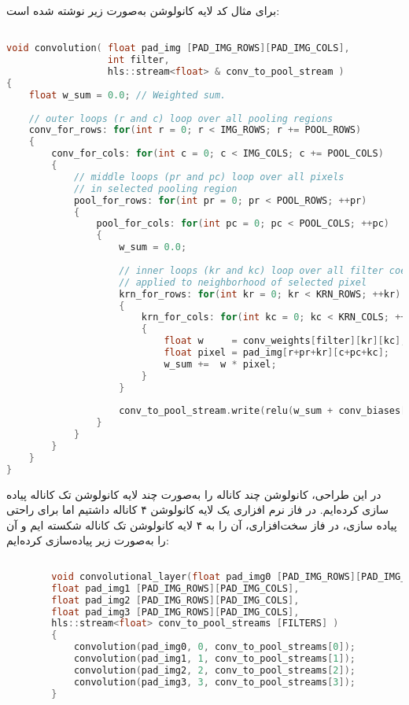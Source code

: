 برای مثال کد لایه کانولوشن به‌صورت زیر نوشته شده است:




\begin{latin}
\begin{lstlisting}[language=C,caption={HLS Implementation of Convolution Layer}]

void convolution( float pad_img [PAD_IMG_ROWS][PAD_IMG_COLS],
				  int filter,
				  hls::stream<float> & conv_to_pool_stream )
{
	float w_sum = 0.0; // Weighted sum.
	
	// outer loops (r and c) loop over all pooling regions
	conv_for_rows: for(int r = 0; r < IMG_ROWS; r += POOL_ROWS)
	{
		conv_for_cols: for(int c = 0; c < IMG_COLS; c += POOL_COLS)
		{
			// middle loops (pr and pc) loop over all pixels
			// in selected pooling region
			pool_for_rows: for(int pr = 0; pr < POOL_ROWS; ++pr)
			{
				pool_for_cols: for(int pc = 0; pc < POOL_COLS; ++pc)
				{
					w_sum = 0.0;
					
					// inner loops (kr and kc) loop over all filter coefficients
					// applied to neighborhood of selected pixel
					krn_for_rows: for(int kr = 0; kr < KRN_ROWS; ++kr)
					{
						krn_for_cols: for(int kc = 0; kc < KRN_COLS; ++kc)
						{
							float w     = conv_weights[filter][kr][kc];
							float pixel = pad_img[r+pr+kr][c+pc+kc];
							w_sum +=  w * pixel;
						}
					}
					
					conv_to_pool_stream.write(relu(w_sum + conv_biases[filter]));
				}
			}
		}
	}
}
\end{lstlisting}
\end{latin}

در این طراحی، کانولوشن چند کاناله را به‌صورت چند لایه کانولوشن تک کاناله پیاده سازی کرده‌ایم. در فاز نرم افزاری یک لایه کانولوشن ۴ کاناله داشتیم اما برای راحتی پیاده سازی، در فاز سخت‌افزاری، آن را به ۴ لایه کانولوشن تک کاناله شکسته ایم و آن را به‌صورت زیر پیاده‌سازی کرده‌ایم:



\begin{latin}
	\begin{lstlisting}[language=C,caption={HLS Implementation of Convolution Layers}]
		
		void convolutional_layer(float pad_img0 [PAD_IMG_ROWS][PAD_IMG_COLS],
		float pad_img1 [PAD_IMG_ROWS][PAD_IMG_COLS],
		float pad_img2 [PAD_IMG_ROWS][PAD_IMG_COLS],
		float pad_img3 [PAD_IMG_ROWS][PAD_IMG_COLS],
		hls::stream<float> conv_to_pool_streams [FILTERS] )
		{
			convolution(pad_img0, 0, conv_to_pool_streams[0]);
			convolution(pad_img1, 1, conv_to_pool_streams[1]);
			convolution(pad_img2, 2, conv_to_pool_streams[2]);
			convolution(pad_img3, 3, conv_to_pool_streams[3]);
		}
	\end{lstlisting}
\end{latin}





